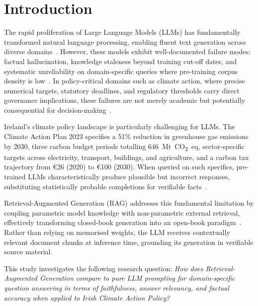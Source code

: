 \documentclass[conference]{IEEEtran}
\begin{document}
\section{Introduction}

The rapid proliferation of Large Language Models (LLMs) has fundamentally transformed natural language processing, enabling fluent text generation across diverse domains~\cite{brown2020language}. However, these models exhibit well-documented failure modes: factual hallucination, knowledge staleness beyond training cut-off dates, and systematic unreliability on domain-specific queries where pre-training corpus density is low~\cite{ji2023survey}. In policy-critical domains such as climate action, where precise numerical targets, statutory deadlines, and regulatory thresholds carry direct governance implications, these failures are not merely academic but potentially consequential for decision-making~\cite{huang2023survey}.

Ireland's climate policy landscape is particularly challenging for LLMs. The Climate Action Plan 2023 specifies a 51\% reduction in greenhouse gas emissions by 2030, three carbon budget periods totalling 646~Mt~CO\textsubscript{2}~eq, sector-specific targets across electricity, transport, buildings, and agriculture, and a carbon tax trajectory from \euro26 (2020) to \euro100 (2030). When queried on such specifics, pre-trained LLMs characteristically produce plausible but incorrect responses, substituting statistically probable completions for verifiable facts~\cite{lewis2020retrieval}.

Retrieval-Augmented Generation (RAG) addresses this fundamental limitation by coupling parametric model knowledge with non-parametric external retrieval, effectively transforming closed-book generation into an open-book paradigm~\cite{lewis2020retrieval}. Rather than relying on memorised weights, the LLM receives contextually relevant document chunks at inference time, grounding its generation in verifiable source material.

This study investigates the following research question: \textit{How does Retrieval-Augmented Generation compare to pure LLM prompting for domain-specific question answering in terms of faithfulness, answer relevancy, and factual accuracy when applied to Irish Climate Action Policy?}
\end{document}
